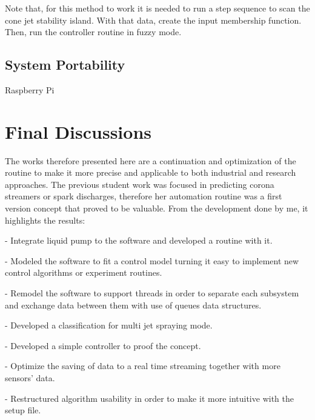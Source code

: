         Note that, for this method to work it is needed to run a step sequence to scan the cone jet stability island. With that data, create the input membership function. Then, run the controller routine in fuzzy mode.

    
    \subsection{System Portability}
    \label{subsec:portability}

        Raspberry Pi


    \section{Final Discussions}

        The works therefore presented here are a continuation and optimization of the routine to make it more precise and applicable to both industrial and research approaches.
        The previous student work was focused in predicting corona streamers or spark discharges, therefore her automation routine was a first version concept that proved to be valuable.
        From the development done by me, it highlights the results:
        
        - Integrate liquid pump to the software and developed a routine with it.
        
        - Modeled the software to fit a control model turning it easy to implement new control algorithms or experiment routines.
        
        - Remodel the software to support threads in order to separate each subsystem and exchange data between them with use of queues data structures.
        
        - Developed a classification for multi jet spraying mode.
        
        - Developed a simple controller to proof the concept.
        
        - Optimize the saving of data to a real time streaming together with more sensors' data.
        
        - Restructured algorithm usability in order to make it more intuitive with the setup file.
        
        
\clearpage
